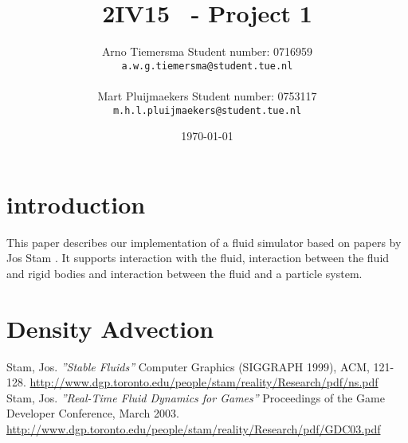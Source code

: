 \documentclass[a4paper,twoside,11pt,twocolumn]{article}
\title{\sffamily\bfseries 2IV15 \scg\ - Project 1}
\author{Arno Tiemersma \qquad Student number: 0716959 \\{\tt a.w.g.tiemersma@student.tue.nl}\\ \\Mart Pluijmaekers \qquad Student number: 0753117 \\{\tt m.h.l.pluijmaekers@student.tue.nl}}
\date{\today}
\begin{document}
\maketitle
\section{introduction}
This paper describes our implementation of a fluid simulator based on papers by Jos Stam \cite{url:stam1, url:stam2}. It supports interaction with the fluid, interaction between the fluid and rigid bodies and interaction between the fluid and a particle system.

\section{Density Advection}

\begin{thebibliography}{9}
 Stam, Jos. \emph{''Stable Fluids''} Computer Graphics (SIGGRAPH 1999), ACM, 121-128. \url{http://www.dgp.toronto.edu/people/stam/reality/Research/pdf/ns.pdf}
 Stam, Jos. \emph{''Real-Time Fluid Dynamics for Games''} Proceedings of the Game Developer
Conference, March 2003. \url{http://www.dgp.toronto.edu/people/stam/reality/Research/pdf/GDC03.pdf}
\end{thebibliography}
\end{document}
